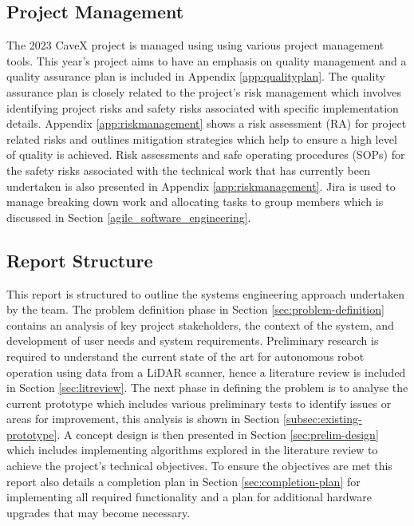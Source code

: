 \subsection{Project Management}
The 2023 CaveX project is managed using using various project management tools. This year's project aims to have an emphasis on quality management and a quality assurance plan is included in Appendix \ref{app:qualityplan}. The quality assurance plan is closely related to the project's risk management which involves identifying project risks and safety risks associated with specific implementation details. Appendix \ref{app:riskmanagement} shows a risk assessment (RA) for project related risks and outlines mitigation strategies which help to ensure a high level of quality is achieved. Risk assessments and safe operating procedures (SOPs) for the safety risks associated with the technical work that has currently been undertaken is also presented in Appendix \ref{app:riskmanagement}. Jira is used to manage breaking down work and allocating tasks to group members which is discussed in Section \ref{agile_software_engineering}.

\subsection{Report Structure}
This report is structured to outline the systems engineering approach undertaken by the team. The problem definition phase in Section \ref{sec:problem-definition} contains an analysis of key project stakeholders, the context of the system, and development of user needs and system requirements. Preliminary research is required to understand the current state of the art for autonomous robot operation using data from a LiDAR scanner, hence a literature review is included in Section \ref{sec:litreview}. The next phase in defining the problem is to analyse the current prototype which includes various preliminary tests to identify issues or areas for improvement, this analysis is shown in Section \ref{subsec:existing-prototype}. A concept design is then presented in Section \ref{sec:prelim-design} which includes implementing algorithms explored in the literature review to achieve the project's technical objectives. To ensure the objectives are met this report also details a completion plan in Section \ref{sec:completion-plan} for implementing all required functionality and a plan for additional hardware upgrades that may become necessary.